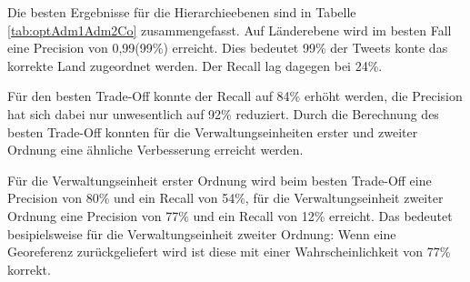 			Die besten Ergebnisse für die Hierarchieebenen sind in Tabelle \ref{tab:optAdm1Adm2Co} zusammengefasst.
			Auf Länderebene wird im besten Fall eine Precision von 0,99(99\%) erreicht.
			Dies bedeutet 99\% der Tweets konte das korrekte Land zugeordnet werden.
			Der Recall lag dagegen bei 24\%.

			Für den besten Trade-Off konnte der Recall auf 84\% erhöht werden, die Precision hat sich dabei nur unwesentlich auf 92\% reduziert. 
			Durch die Berechnung des besten Trade-Off konnten für die Verwaltungseinheiten erster und zweiter Ordnung eine ähnliche Verbesserung erreicht werden.

			Für die Verwaltungseinheit erster Ordnung wird beim besten Trade-Off eine Precision von 80\% und ein Recall von 54\%, für die Verwaltungseinheit zweiter Ordnung eine Precision von 77\% und ein Recall von 12\% erreicht. 
			Das bedeutet besipielsweise für die Verwaltungseinheit zweiter Ordnung: Wenn eine Georeferenz zurückgeliefert wird ist diese mit einer Wahrscheinlichkeit von 77\% korrekt. 

